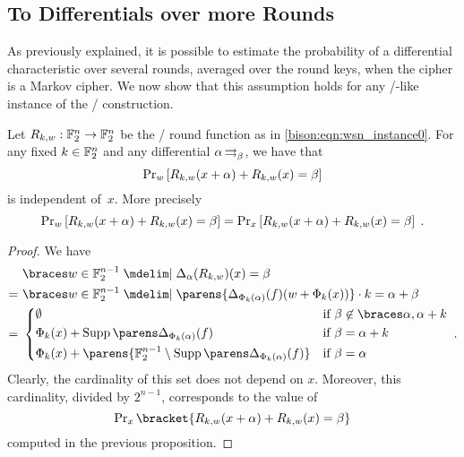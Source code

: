 \subsection{To Differentials over more Rounds}
As previously explained, it is possible to estimate the probability of a differential characteristic over several rounds, averaged over the round keys, when the cipher is a Markov cipher.
We now show that this assumption holds for any \bison/-like instance of the \WSN/ construction.

\begin{lemma}
    Let $R_{k,w} : \mathbb{F}_2^n \to \mathbb{F}_2^n$ be the \WSN/ round function as in \cref{bison:eqn:wsn_instance0}.
    For any fixed $k \in \mathbb{F}_2^n$ and any differential $\propDiff{\alpha}{}{\beta}$, we have that
    \begin{equation*}
        \operatorname{Pr}_w \left[R_{k,w}(x+\alpha) + R_{k,w}(x) =\beta\right]
    \end{equation*}
    is independent of~$x$.
    More precisely
    \begin{equation*}
        \operatorname{Pr}_w \left[R_{k,w}(x+\alpha) + R_{k,w}(x) =\beta\right] = \operatorname{Pr}_x \left[R_{k,w}(x+\alpha) + R_{k,w}(x) =\beta\right]\;.
    \end{equation*}
\end{lemma}
\begin{proof}
    We have
    \begin{align*}
           &\set{w \in \F_2^{n-1} \given \Delta_\alpha (R_{k,w})(x)=\beta} \\
        =\ &\set{w \in \F_2^{n-1} \given \parens{\Delta_{\Phi_k(\alpha)}(f)(w+\Phi_k(x))} \cdot k = \alpha + \beta}\\
        =\ &\begin{cases*}
            \emptyset & if $\beta \not \in \set{\alpha, \alpha+k}$\\
            \Phi_k(x) + \supp{\Delta_{\Phi_k(\alpha)}(f)} & if $\beta=\alpha + k$\\
            \Phi_k(x) + \parens{\F_2^{n-1} \setminus \supp{\Delta_{\Phi_k(\alpha)}(f)}} & if $\beta=\alpha$
        \end{cases*}\;.
    \end{align*}
    Clearly, the cardinality of this set does not depend on $x$. Moreover, this cardinality, divided by $2^{n-1}$, corresponds to the value of
    \begin{equation*}
        \Prob_x \bracket{R_{k,w}(x+\alpha) + R_{k,w}(x) =\beta}
    \end{equation*}
    computed in the previous proposition.
\end{proof}
